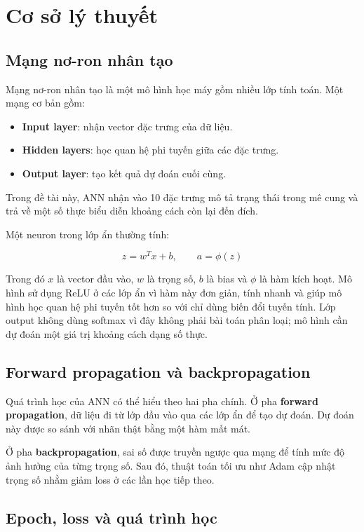 \documentclass[12pt,a4paper]{article}
\begin{document}
\section{Cơ sở lý thuyết}

\subsection{Mạng nơ-ron nhân tạo}

Mạng nơ-ron nhân tạo là một mô hình học máy gồm nhiều lớp tính toán. Một mạng cơ bản gồm:

\begin{itemize}
    \item \textbf{Input layer}: nhận vector đặc trưng của dữ liệu.
    \item \textbf{Hidden layers}: học quan hệ phi tuyến giữa các đặc trưng.
    \item \textbf{Output layer}: tạo kết quả dự đoán cuối cùng.
\end{itemize}

Trong đề tài này, ANN nhận vào 10 đặc trưng mô tả trạng thái trong mê cung và trả về một số thực biểu diễn khoảng cách còn lại đến đích.

Một neuron trong lớp ẩn thường tính:

\[
    z = w^T x + b,\qquad a = \phi(z)
\]

Trong đó \(x\) là vector đầu vào, \(w\) là trọng số, \(b\) là bias và \(\phi\) là hàm kích hoạt. Mô hình sử dụng ReLU ở các lớp ẩn vì hàm này đơn giản, tính nhanh và giúp mô hình học quan hệ phi tuyến tốt hơn so với chỉ dùng biến đổi tuyến tính. Lớp output không dùng softmax vì đây không phải bài toán phân loại; mô hình cần dự đoán một giá trị khoảng cách dạng số thực.

\subsection{Forward propagation và backpropagation}

Quá trình học của ANN có thể hiểu theo hai pha chính. Ở pha \textbf{forward propagation}, dữ liệu đi từ lớp đầu vào qua các lớp ẩn để tạo dự đoán. Dự đoán này được so sánh với nhãn thật bằng một hàm mất mát.

Ở pha \textbf{backpropagation}, sai số được truyền ngược qua mạng để tính mức độ ảnh hưởng của từng trọng số. Sau đó, thuật toán tối ưu như Adam cập nhật trọng số nhằm giảm loss ở các lần học tiếp theo.

\subsection{Epoch, loss và quá trình học}
\end{document}
